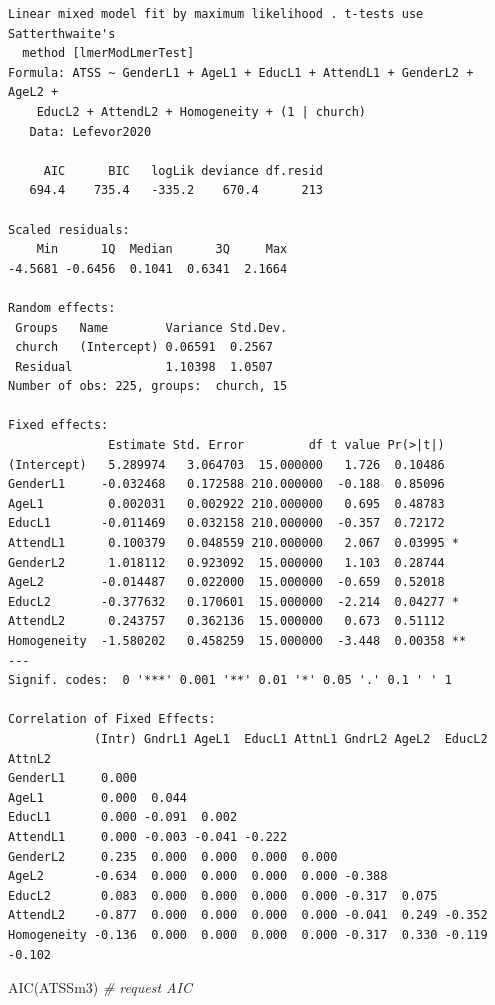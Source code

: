 \documentclass[
  11pt,
]{book}
\newenvironment{Shaded}{\begin{snugshade}}{\end{snugshade}}
\newcommand{\CommentTok}[1]{\textcolor[rgb]{0.56,0.35,0.01}{\textit{#1}}}
\newcommand{\FunctionTok}[1]{\textcolor[rgb]{0.00,0.00,0.00}{#1}}
\newcommand{\NormalTok}[1]{#1}
\begin{document}
\begin{verbatim}
Linear mixed model fit by maximum likelihood . t-tests use Satterthwaite's
  method [lmerModLmerTest]
Formula: ATSS ~ GenderL1 + AgeL1 + EducL1 + AttendL1 + GenderL2 + AgeL2 +  
    EducL2 + AttendL2 + Homogeneity + (1 | church)
   Data: Lefevor2020

     AIC      BIC   logLik deviance df.resid 
   694.4    735.4   -335.2    670.4      213 

Scaled residuals: 
    Min      1Q  Median      3Q     Max 
-4.5681 -0.6456  0.1041  0.6341  2.1664 

Random effects:
 Groups   Name        Variance Std.Dev.
 church   (Intercept) 0.06591  0.2567  
 Residual             1.10398  1.0507  
Number of obs: 225, groups:  church, 15

Fixed effects:
              Estimate Std. Error         df t value Pr(>|t|)   
(Intercept)   5.289974   3.064703  15.000000   1.726  0.10486   
GenderL1     -0.032468   0.172588 210.000000  -0.188  0.85096   
AgeL1         0.002031   0.002922 210.000000   0.695  0.48783   
EducL1       -0.011469   0.032158 210.000000  -0.357  0.72172   
AttendL1      0.100379   0.048559 210.000000   2.067  0.03995 * 
GenderL2      1.018112   0.923092  15.000000   1.103  0.28744   
AgeL2        -0.014487   0.022000  15.000000  -0.659  0.52018   
EducL2       -0.377632   0.170601  15.000000  -2.214  0.04277 * 
AttendL2      0.243757   0.362136  15.000000   0.673  0.51112   
Homogeneity  -1.580202   0.458259  15.000000  -3.448  0.00358 **
---
Signif. codes:  0 '***' 0.001 '**' 0.01 '*' 0.05 '.' 0.1 ' ' 1

Correlation of Fixed Effects:
            (Intr) GndrL1 AgeL1  EducL1 AttnL1 GndrL2 AgeL2  EducL2 AttnL2
GenderL1     0.000                                                        
AgeL1        0.000  0.044                                                 
EducL1       0.000 -0.091  0.002                                          
AttendL1     0.000 -0.003 -0.041 -0.222                                   
GenderL2     0.235  0.000  0.000  0.000  0.000                            
AgeL2       -0.634  0.000  0.000  0.000  0.000 -0.388                     
EducL2       0.083  0.000  0.000  0.000  0.000 -0.317  0.075              
AttendL2    -0.877  0.000  0.000  0.000  0.000 -0.041  0.249 -0.352       
Homogeneity -0.136  0.000  0.000  0.000  0.000 -0.317  0.330 -0.119 -0.102
\end{verbatim}

\begin{Shaded}
\begin{Highlighting}[]
\FunctionTok{AIC}\NormalTok{(ATSSm3) }\CommentTok{\# request AIC}
\end{Highlighting}
\end{Shaded}
\end{document}
